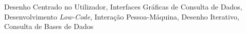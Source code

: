 











\begin{keywords}
Desenho Centrado no Utilizador, Interfaces Gráficas de Consulta de Dados, Desenvolvimento \textit{Low-Code}, Interação Pessoa-Máquina, Desenho Iterativo, Consulta de Bases de Dados
\end{keywords}
